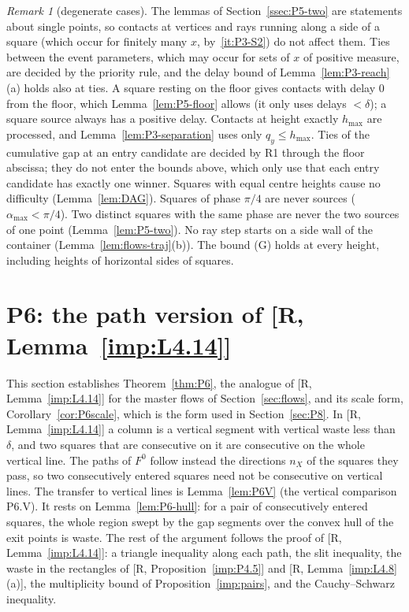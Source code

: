 \documentclass[11pt]{amsart}
\newcommand{\amax}{\alpha_{\max}}
\newcommand{\hmax}{h_{\max}}
\newcommand{\Fz}{F^{0}}
\theoremstyle{definition}
\theoremstyle{remark}
\newtheorem{remark}[theorem]{Remark}
\numberwithin{equation}{section}
\begin{document}
\begin{remark}[degenerate cases]\label{rem:P5-degenerate}
The lemmas of Section~\ref{ssec:P5-two} are statements about single points, so contacts at vertices and rays running along a side of a square (which occur for finitely many $x$, by~\ref{it:P3-S2}) do not affect them. Ties between the event parameters, which may occur for sets of $x$ of positive measure, are decided by the priority rule, and the delay bound of Lemma~\ref{lem:P3-reach}(a) holds also at ties. A square resting on the floor gives contacts with delay $0$ from the floor, which Lemma~\ref{lem:P5-floor} allows (it only uses delays $<\delta$); a square source always has a positive delay. Contacts at height exactly $\hmax$ are processed, and Lemma~\ref{lem:P3-separation} uses only $q_y\le\hmax$. Ties of the cumulative gap at an entry candidate are decided by R1 through the floor abscissa; they do not enter the bounds above, which only use that each entry candidate has exactly one winner. Squares with equal centre heights cause no difficulty (Lemma~\ref{lem:DAG}). Squares of phase $\pi/4$ are never sources ($\amax<\pi/4$). Two distinct squares with the same phase are never the two sources of one point (Lemma~\ref{lem:P5-two}). No ray step starts on a side wall of the container (Lemma~\ref{lem:flows-traj}(b)). The bound (G) holds at every height, including heights of horizontal sides of squares.
\end{remark}

\section{P6: the path version of \texorpdfstring{[R, Lemma~\ref{imp:L4.14}]}{[R, Lemma 4.14]}}\label{sec:P6}

This section establishes Theorem~\ref{thm:P6}, the analogue of [R, Lemma~\ref{imp:L4.14}] for the master flows of
Section~\ref{sec:flows}, and its scale form, Corollary~\ref{cor:P6scale}, which is the form used in
Section~\ref{sec:P8}. In [R, Lemma~\ref{imp:L4.14}] a column is a vertical segment with vertical waste less than
$\delta$, and two squares that are consecutive on it are consecutive on the whole vertical line. The paths of $\Fz$
follow instead the directions $n_X$ of the squares they pass, so two consecutively entered squares need not be
consecutive on vertical lines. The transfer to vertical lines is Lemma~\ref{lem:P6V} (the vertical comparison P6.V).
It rests on Lemma~\ref{lem:P6-hull}: for a pair of consecutively entered squares, the whole region swept by the gap
segments over the convex hull of the exit points is waste. The rest of the argument follows the proof of
[R, Lemma~\ref{imp:L4.14}]: a triangle inequality along each path, the slit inequality, the waste in the rectangles
of [R, Proposition~\ref{imp:P4.5}] and [R, Lemma~\ref{imp:L4.8}(a)], the multiplicity bound of
Proposition~\ref{imp:pairs}, and the Cauchy--Schwarz inequality.
\end{document}
